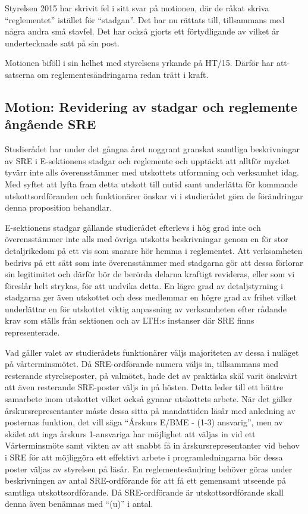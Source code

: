 \documentclass[../_main/handlingar.tex]{subfiles}
\begin{document}
\begin{itshape}
Styrelsen 2015 har skrivit fel i sitt svar på motionen, där de råkat skriva ``reglementet'' istället för ``stadgan''. Det har nu rättats till, tillsammans med några andra små stavfel. Det har också gjorts ett förtydligande av vilket år undertecknade satt på sin post.

Motionen biföll i sin helhet med styrelsens yrkande på HT/15. Därför har att-satserna om reglementesändringarna redan trätt i kraft.
\end{itshape}

\subsection*{Motion: Revidering av stadgar och reglemente ångående SRE}

Studierådet har under det gångna året noggrant granskat samtliga beskrivningar av SRE i E-sektionens stadgar och reglemente och upptäckt att alltför mycket tyvärr inte alls överensstämmer med utskottets utformning och verksamhet idag. Med syftet att lyfta fram detta utskott till nutid samt underlätta för kommande utskottsordföranden och funktionärer önskar vi i studierådet göra de förändringar denna proposition behandlar.

E-sektionens stadgar gällande studierådet efterlevs i hög grad inte och överensstämmer inte alls med övriga utskotts beskrivningar genom en för stor detaljrikedom på ett vis som snarare hör hemma i reglementet. Att verksamheten bedrivs på ett sätt som inte överensstämmer med stadgarna gör att dessa förlorar sin legitimitet och därför bör de berörda delarna kraftigt revideras, eller som vi föreslår helt strykas, för att undvika detta. En lägre grad av detaljstyrning i stadgarna ger även utskottet och dess medlemmar en högre grad av frihet vilket underlättar en för utskottet viktig anpassning av verksamheten efter rådande krav som ställs från sektionen och av LTH:s instanser där SRE finns representerade.

Vad gäller valet av studierådets funktionärer väljs majoriteten av dessa i nuläget på vårterminsmötet. Då SRE-ordförande numera väljs in, tillsammans med resterande styrelseposter, på valmötet, hade det av praktiska skäl varit önskvärt att även resterande SRE-poster väljs in på hösten. Detta leder till ett bättre samarbete inom utskottet vilket också gynnar utskottets arbete. När det gäller årskursrepresentanter måste dessa sitta på mandattiden läsår med anledning av posternas funktion, det vill säga ``Årskurs E/BME - (1-3) ansvarig'', men av skälet att inga årskurs 1-ansvariga har möjlighet att väljas in vid ett Vårterminsmöte samt vikten av att snabbt få in årskursrepresentanter vid behov i SRE för att möjliggöra ett effektivt arbete i programledningarna bör dessa poster väljas av styrelsen på läsår. En reglementesändring behöver göras under beskrivningen av antal SRE-ordförande för att få ett gemensamt utseende på samtliga utskottsordförande. Då SRE-ordförande är utskottsordförande skall denna även benämnas med ``(u)'' i antal.
\end{document}
